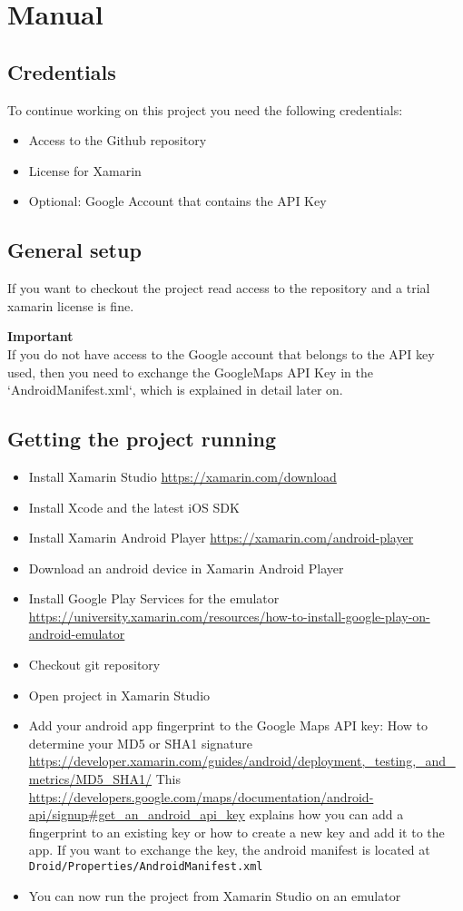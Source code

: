 \section{Manual}
\subsection{Credentials}
To continue working on this project you need the following credentials:
\begin{itemize}
\item Access to the Github repository
\item License for Xamarin 
\item Optional: Google Account that contains the API Key
\end{itemize}

\subsection{General setup}
If you want to checkout the project read access to the repository and a trial xamarin license is fine.

\textbf{Important}\\
If you do not have access to the Google account that belongs to the API key used, then you need to exchange the GoogleMaps API Key in the `AndroidManifest.xml`, which is explained in detail later on.

\subsection{Getting the project running}
\begin{itemize}
\item Install Xamarin Studio \url{https://xamarin.com/download}
\item Install Xcode and the latest iOS SDK
\item Install Xamarin Android Player \url{https://xamarin.com/android-player}
\item Download an android device in Xamarin Android Player
\item Install Google Play Services for the emulator \url{https://university.xamarin.com/resources/how-to-install-google-play-on-android-emulator}
\item Checkout git repository
\item Open project in Xamarin Studio
\item  Add your android app fingerprint to the Google Maps API key:
\subitem How to determine your MD5 or SHA1 signature \url{https://developer.xamarin.com/guides/android/deployment,_testing,_and_metrics/MD5_SHA1/}
\subitem This \url{https://developers.google.com/maps/documentation/android-api/signup#get_an_android_api_key} explains how you can add a fingerprint to an existing key or how to create a new key and add it to the app.
\subitem If you want to exchange the key, the android manifest is located at \linebreak \texttt{Droid/Properties/AndroidManifest.xml}
\item  You can now run the project from Xamarin Studio on an emulator

\end{itemize}
 

